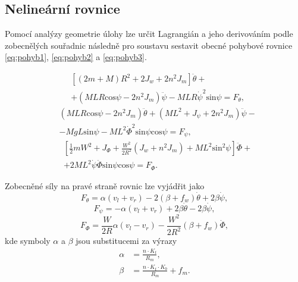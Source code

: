 \documentclass[conference]{IEEEtran}
\begin{document}
\pagebreak
\subsection{Nelineární rovnice}
Pomocí analýzy geometrie úlohy lze určit Lagrangián a jeho derivováním podle zobecnělých souřadnic 
následně pro soustavu sestavit obecné pohybové rovnice \eqref{eq:pohyb1}, \eqref{eq:pohyb2} a \eqref{eq:pohyb3}.

\begin{equation}
    \begin{aligned}
        &\left[(2m + M) R^2 + 2 J_w + 2n^2 J_m\right] \ddot{\theta} + \\
        &+ (MLR \text{cos} \psi - 2n^2 J_m) \ddot{\psi} - MLR\dot{\psi}^2 \text{sin} \psi = F_\theta,
    \end{aligned}
    \label{eq:pohyb1}
\end{equation}
\begin{equation}
    \begin{aligned}
        & (MLR \text{cos} \psi - 2n^2 J_m) \ddot{\theta} + (ML^2 + J_\psi + 2n^2 J_m) \ddot{\psi} - \\
        & - MgL\text{sin}\psi - ML^2\dot{\varPhi}^2 \text{sin} \psi \text{cos} \psi = F_\psi,
    \end{aligned}
    \label{eq:pohyb2}
\end{equation}
\begin{equation}
    \begin{aligned}
        &\left[ \frac{1}{2} mW^2  + J_\varPhi + \frac{W^2}{2R^2}\left( J_w + n^2 J_m \right) + ML^2 \text{sin}^2 \psi \right] \ddot{\varPhi} + \\
        &+ 2ML^2 \dot{\psi} \dot{\varPhi} \text{sin}\psi \text{cos} \psi = F_\varPhi.
    \end{aligned}
    \label{eq:pohyb3}
\end{equation}

Zobecněné síly na pravé straně rovnic lze vyjádřit jako
\begin{equation}
    F_\theta = \alpha(v_l + v_r) - 2(\beta + f_w) \dot{\theta} + 2\beta\dot{\psi},
    \label{eq:motor1}
\end{equation}
\begin{equation}
    F_\psi = -\alpha(v_l + v_r) + 2\beta \dot{\theta} - 2\beta \dot{\psi},
    \label{eq:motor2}
\end{equation}
\begin{equation}
    F_\varPhi = \frac{W}{2R} \alpha (v_l - v_r) - \frac{W^2}{2R^2}(\beta + f_w) \dot{\varPhi},
    \label{eq:motor3}
\end{equation}
kde symboly $\alpha$ a $\beta$ jsou substitucemi za výrazy
\begin{equation}
    \begin{split}
        \alpha &= \frac{n \cdot K_t} {R_m},  \\
        \beta &= \frac{n \cdot K_t \cdot K_b} {R_m} + f_m .
    \end{split}
    \label{eq:motor_substituce}
\end{equation}
\end{document}
